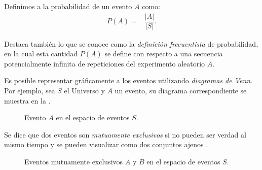 \begin{definition}
Definimos a la probabilidad de un evento $A$ como:
\begin{align}
 P(A) =& \dfrac{|A|}{|S|}. \label{eq:proba_laplace}
\end{align}

Destaca también lo que se conoce como la \emph{definición frecuentista} de probabilidad, en la cual esta cantidad $P(A)$ se define con respecto a una secuencia potencialmente infinita de repeticiones del experimento aleatorio $A$.
\end{definition}

Es posible representar gráficamente a los eventos utilizando \emph{diagramas de Venn}.  Por ejemplo, sea $S$ el Universo y $A$ un evento, su diagrama correspondiente se muestra en la .

\begin{figure}
  \centering
  \def\firstcircle{(0,0) circle (1.5cm)}
  \def\universesquare{(-3,-2) rectangle (3,2)}
  \caption{Evento $A$ en el espacio de eventos $S$.}\label{fig:venn_a}
\end{figure}

Se dice que dos eventos son \emph{mutuamente exclusivos} si no pueden ser verdad al mismo tiempo y se pueden visualizar como dos conjuntos ajenos .

\begin{figure}
  \centering
  \def\firstcircle{(-1.25,0) circle (1cm)}
  \def\secondcircle{(1.25,0) circle (1cm)}
  \def\universesquare{(-3,-2) rectangle (3,2)}
  \caption{Eventos mutuamente exclusivos $A$ y $B$ en el espacio de eventos $S$.}\label{fig:exclusivos}
\end{figure}

